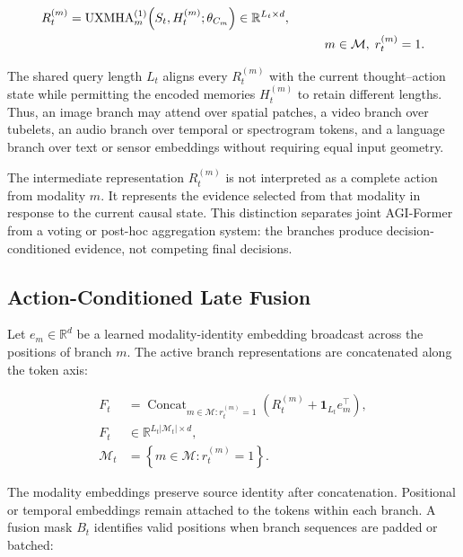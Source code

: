 \begin{equation}
\begin{aligned}
    R_t^{(m)}
    &= \operatorname{UXMHA}^{(1)}_{m}\!\left(
       S_t,H_t^{(m)};\theta_{C_m}
       \right)
     \in\mathbb{R}^{L_t\times d},\\
    &\hspace{7.2cm}
       m\in\mathcal{M},\;r_t^{(m)}=1.
\end{aligned}
\label{eq:joint_conditioned_modality}
\end{equation}

The shared query length $L_t$ aligns every $R_t^{(m)}$ with the current thought--action state while permitting the encoded memories $H_t^{(m)}$ to retain different lengths. Thus, an image branch may attend over spatial patches, a video branch over tubelets, an audio branch over temporal or spectrogram tokens, and a language branch over text or sensor embeddings without requiring equal input geometry.

The intermediate representation $R_t^{(m)}$ is not interpreted as a complete action from modality $m$. It represents the evidence selected from that modality in response to the current causal state. This distinction separates joint AGI-Former from a voting or post-hoc aggregation system: the branches produce decision-conditioned evidence, not competing final decisions.

\subsection{\textbf{Action-Conditioned Late Fusion}}

Let $e_m\in\mathbb{R}^{d}$ be a learned modality-identity embedding broadcast across the positions of branch $m$. The active branch representations are concatenated along the token axis:

\begin{equation}
\begin{aligned}
    F_t
    &= \mathop{\operatorname{Concat}}_{m\in\mathcal{M}:r_t^{(m)}=1}
       \left(R_t^{(m)}+\mathbf{1}_{L_t}e_m^{\top}\right),\\
    F_t
    &\in\mathbb{R}^{L_t|\mathcal{M}_t|\times d},\\
    \mathcal{M}_t
    &= \left\{m\in\mathcal{M}:r_t^{(m)}=1\right\}.
\end{aligned}
\label{eq:joint_concatenation}
\end{equation}

The modality embeddings preserve source identity after concatenation. Positional or temporal embeddings remain attached to the tokens within each branch. A fusion mask $B_t$ identifies valid positions when branch sequences are padded or batched:

